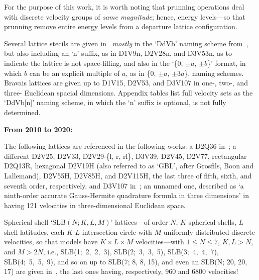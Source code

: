     For the purpose of this work, it is worth noting that prunning operations deal with discrete velocity groups  of  \emph{same
    magnitude}; hence, energy levels---so that prunning remove entire energy levels from a departure lattice configuration.

    Several lattice stecils are given in~\cite{2009-SurmasR+PhilippiPC-EurPhysJSpecialTopics} \emph{mostly} in the `DdVb' naming
    scheme from~\cite{2006-PhilippiPC+SurmasR-PhysRevE}, but also including an `n' suffix, as in D1V9n, D2V28n, and  D3V53n,  as
    to indicate the lattice is not space-filling, and also in the `\{$0$, $\pm a$, $\pm b$\}' format, in which  $b$  can  be  an
    explicit multiple of $a$, as in \{$0$, $\pm a$, $\pm 3a$\}, naming schemes. Bravais lattices are given up to  D1V15,  D2V53,
    and D3V107 in one-, two-, and three- Euclidean spacial dimensions. Appendix tables list full velocity sets as the  `DdVb[n]'
    naming scheme, in which the `n' suffix is optional, is not fully determined.

    \vspace{2.0mm}\noindent\textbf{From 2010 to 2020:}\vspace{1.0mm}

    The      following      lattices      are      referenced      in       the       following       works:       a       D2Q36
    in~\cite[p.~452]{2010-AidunCK+ClausenJR-AnnuRevFluidMech}; a different D2V25,  D2V33,  D2V29-\{l,  r,  rl\},  D3V39,  D2V45,
    D2V77, rectangular D2Q13R, hexagonal D2V19H (also referred to as `GBL', after Grosfils, Boon and Lallemand), D2V55H, D2V85H,
    and D2V115H, the last three of fifth, sixth, and seventh order, respectively, and D3V107 in~\cite{2010-HegeleLA-DrUFSC};  an
    unnamed  one,  described  as   `a   ninth-order   accurate   Gauss-Hermite   quadrature   formula   in   three   dimensions'
    in~\cite{2008-NieX+ChenH-PhysRevE} having 121 velocities in three-dimensional Euclidean space.

    Spherical shell `SLB$(N; K, L, M)$' lattices---of order $N$,  $K$  spherical  shells,  $L$  shell  latitudes,  each  $K$-$L$
    intersection circle with $M$ uniformly distributed  discrete  velocities,  so  that  models  have  $K  \times  L  \times  M$
    velocities---with $1 \leqslant N \leqslant  7$,  $K,  L  >  N$,  and  $M  >  2N$,  i.e.,  SLB(1;~2,~2,~3),  SLB(2;~3,~3,~5),
    SLB(3;~4,~4,~7), SLB(4;~5,~5,~9), and so  on  up  to  SLB(7;  8,  8,  15),  and  even  an  SLB(N;  20,  20,  17)  are  given
    in~\cite{2012-AmbrusVE+SofoneaV-PhysRevE}, the last ones having, respectively, 960 and 6800 velocities!

